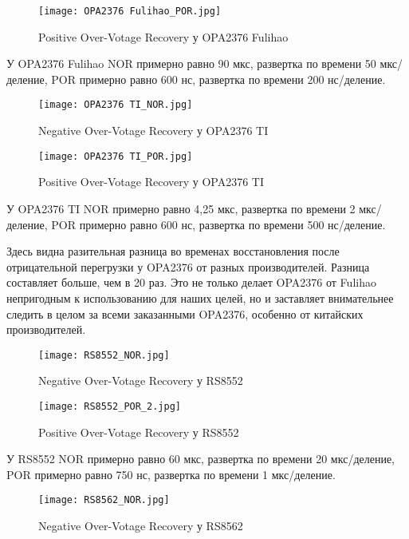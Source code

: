 \begin{figure}[H]
\centering
\texttt{[image: OPA2376 Fulihao\_POR.jpg]}
\caption{Positive Over-Votage Recovery у OPA2376 Fulihao}
\label{ris:418}
\end{figure}

У OPA2376 Fulihao NOR примерно равно 90 мкс, развертка по времени 50 мкс/деление, 
POR примерно равно 600 нс, развертка по времени 200 нс/деление.

\begin{figure}[H]
\centering
\texttt{[image: OPA2376 TI\_NOR.jpg]}
\caption{Negative Over-Votage Recovery у OPA2376 TI}
\label{ris:419}
\end{figure}

\begin{figure}[H]
\centering
\texttt{[image: OPA2376 TI\_POR.jpg]}
\caption{Positive Over-Votage Recovery у OPA2376 TI}
\label{ris:420}
\end{figure}

У OPA2376 TI NOR примерно равно 4,25 мкс, развертка по времени 2 мкс/деление, 
POR примерно равно 600 нс, развертка по времени 500 нс/деление. 

Здесь видна разительная разница во временах восстановления после отрицательной перегрузки у OPA2376 от 
разных производителей. Разница составляет больше, чем в 20 раз. Это не только делает OPA2376 от Fulihao 
непригодным к использованию для наших целей, но и заставляет внимательнее следить в целом за всеми 
заказанными OPA2376, особенно от китайских производителей.

\begin{figure}[H]
\centering
\texttt{[image: RS8552\_NOR.jpg]}
\caption{Negative Over-Votage Recovery у RS8552}
\label{ris:421}
\end{figure}

\begin{figure}[H]
\centering
\texttt{[image: RS8552\_POR\_2.jpg]}
\caption{Positive Over-Votage Recovery у RS8552}
\label{ris:422}
\end{figure}

У RS8552 NOR примерно равно 60 мкс, развертка по времени 20 мкс/деление, 
POR примерно равно 750 нс, развертка по времени 1 мкс/деление.

\begin{figure}[H]
\centering
\texttt{[image: RS8562\_NOR.jpg]}
\caption{Negative Over-Votage Recovery у RS8562}
\label{ris:423}
\end{figure}

